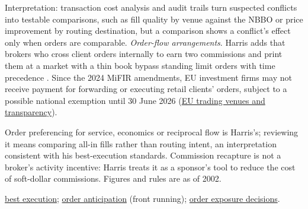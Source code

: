 \begin{qfdefinition}
 Interpretation: transaction cost analysis and audit trails turn suspected conflicts into testable comparisons, such as fill quality by venue against the NBBO or price improvement by routing destination, but a comparison shows a conflict's effect only when orders are comparable. \emph{Order-flow arrangements}. Harris adds that brokers who cross client orders internally to earn two commissions and print them at a market with a thin book bypass standing limit orders with time precedence \citep[chap.~``Competition Within and Among Markets'', box ``Lost Time Precedence'', p.~537]{alpha-harris}. Since the 2024 MiFIR amendments, EU investment firms may not receive payment for forwarding or executing retail clients' orders, subject to a possible national exemption until 30 June 2026 (\hyperref[rule:eu-trading-venue-transparency]{EU trading venues and transparency}).

 Order preferencing for service, economics or reciprocal flow is Harris's; reviewing it means comparing all-in fills rather than routing intent, an interpretation consistent with his best-execution standards. Commission recapture is not a broker's activity incentive: Harris treats it as a sponsor's tool to reduce the cost of soft-dollar commissions. Figures and rules are as of 2002.

 \hyperref[def:best-execution]{best execution}; \hyperref[def:order-anticipation]{order anticipation} (front running); \hyperref[def:order-exposure-decisions]{order exposure decisions}.

\end{qfdefinition}

